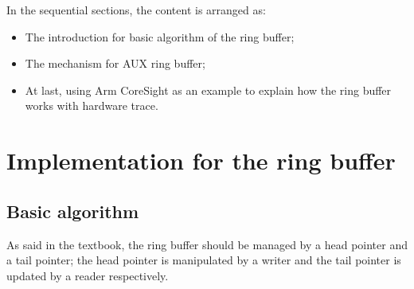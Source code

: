 \documentclass[11pt]{diazessay} %
\begin{document}
In the sequential sections, the content is arranged as:
\begin{itemize}
	\item The introduction for basic algorithm of the ring buffer;
	\item The mechanism for AUX ring buffer;
	\item At last, using Arm CoreSight as an example to explain how the ring buffer works with hardware trace.
\end{itemize}

\section*{Implementation for the ring buffer}

\subsection*{Basic algorithm}

As said in the textbook, the ring buffer should be managed by a head pointer and a tail pointer; the head pointer is manipulated by a writer and the tail pointer is updated by a reader respectively.
\end{document}
